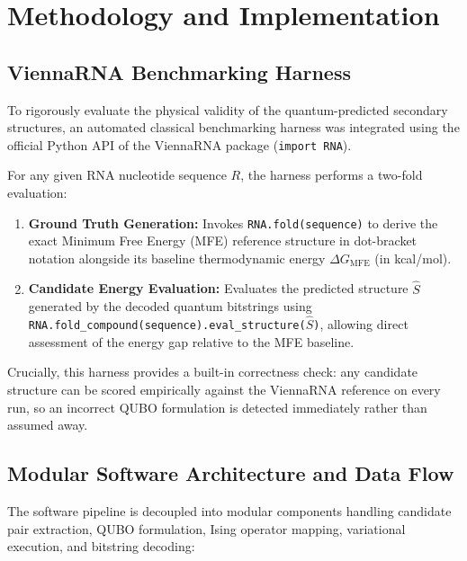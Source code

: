 \documentclass[11pt,a4paper]{article}
\begin{document}
	\clearpage
	
	\section{Methodology and Implementation}
	\label{sec:methodology}
	
	\subsection{ViennaRNA Benchmarking Harness}
	
	To rigorously evaluate the physical validity of the quantum-predicted secondary structures, an automated classical benchmarking harness was integrated using the official Python API of the ViennaRNA package (\texttt{import RNA}).
	
	For any given RNA nucleotide sequence $R$, the harness performs a two-fold evaluation:
	\begin{enumerate}[leftmargin=1.2cm]
		\item \textbf{Ground Truth Generation:} Invokes \texttt{RNA.fold(sequence)} to derive the exact Minimum Free Energy (MFE) reference structure in dot-bracket notation alongside its baseline thermodynamic energy $\Delta G_{\text{MFE}}$ (in kcal/mol).
		\item \textbf{Candidate Energy Evaluation:} Evaluates the predicted structure $\hat{S}$ generated by the decoded quantum bitstrings using \texttt{RNA.fold\_compound(sequence).eval\_structure(}$\hat{S}$\texttt{)}, allowing direct assessment of the energy gap relative to the MFE baseline.
	\end{enumerate}
	
	Crucially, this harness provides a built-in correctness check: any candidate structure can be scored empirically against the ViennaRNA reference on every run, so an incorrect QUBO formulation is detected immediately rather than assumed away.
	
	\subsection{Modular Software Architecture and Data Flow}
	
	The software pipeline is decoupled into modular components handling candidate pair extraction, QUBO formulation, Ising operator mapping, variational execution, and bitstring decoding:
	
\end{document}
